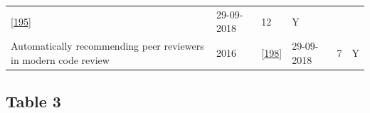 \documentclass[]{book}
\begin{document}
\begin{longtable}[]{@{}llllll@{}}
\begin{minipage}[t]{0.13\columnwidth}
{[}\protect\hyperlink{ref-yang2016mining}{195}{]}\strut
\end{minipage} & \begin{minipage}[t]{0.06\columnwidth}\raggedright\strut
29-09-2018\strut
\end{minipage} & \begin{minipage}[t]{0.07\columnwidth}\raggedright\strut
12\strut
\end{minipage} & \begin{minipage}[t]{0.08\columnwidth}\raggedright\strut
Y\strut
\end{minipage}\tabularnewline
\begin{minipage}[t]{0.47\columnwidth}\raggedright\strut
Automatically recommending peer reviewers in modern code review\strut
\end{minipage} & \begin{minipage}[t]{0.03\columnwidth}\raggedright\strut
2016\strut
\end{minipage} & \begin{minipage}[t]{0.13\columnwidth}\raggedright\strut
{[}\protect\hyperlink{ref-zanjani2016automatically}{198}{]}\strut
\end{minipage} & \begin{minipage}[t]{0.06\columnwidth}\raggedright\strut
29-09-2018\strut
\end{minipage} & \begin{minipage}[t]{0.07\columnwidth}\raggedright\strut
7\strut
\end{minipage} & \begin{minipage}[t]{0.08\columnwidth}\raggedright\strut
Y\strut
\end{minipage}\tabularnewline
\bottomrule
\end{longtable}

\subsection{Table 3}\label{table-3}
\end{document}
